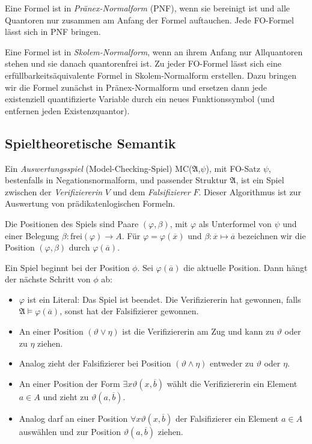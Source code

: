 \documentclass[a4paper,parskip=half*,DIV=15,fontsize=11pt]{scrartcl}
\newcommand{\A}{\mathfrak{A}}
\begin{document}
Eine Formel ist in \emph{Pränex-Normalform} (PNF), wenn sie bereinigt ist und alle Quantoren nur zusammen am Anfang der Formel auftauchen. Jede FO-Formel lässt sich in PNF bringen.

Eine Formel ist in \emph{Skolem-Normalform}, wenn an ihrem Anfang nur Allquantoren stehen und sie danach quantorenfrei ist. Zu jeder FO-Formel lässt sich eine erfüllbarkeitsäquivalente Formel in Skolem-Normalform erstellen. Dazu bringen wir die Formel zunächst in Pränex-Normalform und ersetzen dann jede existenziell quantifizierte Variable durch ein neues Funktionssymbol (und entfernen jeden Existenzquantor).


\subsection{Spieltheoretische Semantik}
Ein \emph{Auswertungsspiel} (Model-Checking-Spiel) MC($\A$,$\psi$), mit FO-Satz $\psi$, bestenfalls in Negationsnormalform, und passender Struktur $\A$, ist ein Spiel zwischen der \emph{Verifiziererin} $V$ und dem \emph{Falsifizierer} $F$. Dieser Algorithmus ist zur Auswertung von prädikatenlogischen Formeln.

Die Positionen des Spiels sind Paare $(\varphi,\beta)$, mit $\varphi$ als Unterformel von $\psi$ und einer Belegung $\beta:\mathrm{frei}(\varphi)\to A$. Für $\varphi=\varphi(\overline{x})$ und $\beta:\overline{x}\mapsto\overline{a}$ bezeichnen wir die Position $(\varphi,\beta)$ durch $\varphi(\overline{a})$.

Ein Spiel beginnt bei der Position $\phi$. Sei $\varphi(\overline{a})$ die aktuelle Position. Dann hängt der nächste Schritt von $\phi$ ab:
\begin{itemize}
    \item $\varphi$ ist ein Literal: Das Spiel ist beendet. Die Verifiziererin hat gewonnen, falls $\A \models \varphi(\overline{a})$, sonst hat der Falsifizierer gewonnen.
    \item An einer Position $(\vartheta \lor \eta)$ ist die Verifiziererin am Zug und kann zu $\vartheta$ oder zu $\eta$ ziehen.
    \item Analog zieht der Falsifizierer bei Position $(\vartheta \land \eta)$ entweder zu $\vartheta$ oder $\eta$.
    \item An einer Position der Form $\exists x \vartheta (x,\overline{b})$ wählt die Verifiziererin ein Element $a \in A$ und zieht zu $\vartheta(a,\overline{b})$.
    \item Analog darf an einer Position $\forall x \vartheta(x,\overline{b})$ der Falsifizierer ein Element $a \in A$ auswählen und zur Position $\vartheta(a,\overline{b})$ ziehen.
\end{itemize}
\end{document}

